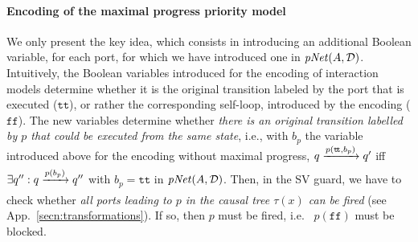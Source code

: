 \documentclass{llncs}
\newcommand{\app}[1]{App.~\ref{secn:#1}}
\newcommand{\cD}{\ensuremath{\mathcal{D}}}
\newcommand{\ie}[1][\ ]{i.e.#1}
\newcommand{\goesto}[2][]{\ensuremath{\xrightarrow[{#1}\relax]{#2}}}
\newcommand{\true} {\ensuremath{\mathtt{t\!t}}}
\newcommand{\false}{\ensuremath{\mathtt{f\!f}}}
\newcommand{\nopri}[1][]{\ensuremath{\mathit{pNet}%
    \ifx#1\relax\else(#1)\fi}}
\newcommand{\partition}{\cD}
\begin{document}
\paragraph{Encoding of the maximal progress priority model}
We only present the key idea, which consists in
introducing an additional Boolean variable, for each port, for which we
have introduced one in $\nopri[A, \partition]$.  Intuitively, 
the Boolean
variables introduced for the encoding of interaction models
determine whether it is the original transition
labeled by the port that is executed (\true), or rather the corresponding
self-loop, introduced by the encoding (\false).  The new variables
determine whether \emph{there is an original transition labelled by
  $p$ that could be executed from the same state}, \ie[,] with $b_p$
the variable introduced above for the encoding without maximal
progress, $q \goesto{p(\true, b_p)} q'$ iff $\exists q'': q
\goesto{p(b_p)} q''$ with $b_p = \true$ in $\nopri[A, \partition]$.
Then, in the SV guard, we have to check whether \emph{all ports
  leading to $p$ in the causal tree $\tau(x)$ can be fired} (see
\app{transformations}).  If so, then $p$ must be fired, \ie
$p(\false)$ must be blocked.







\label{secn:arch:verif}
\end{document}
